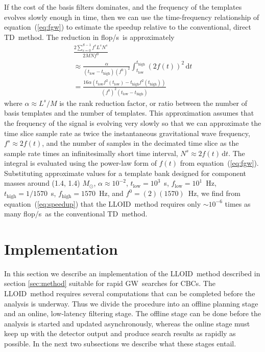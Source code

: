 \documentclass[preprint2]{aastex}
\newcommand{\GW}{GW}%
\newcommand{\CBC}{CBC}%
\newcommand{\tmpsamps}{\ensuremath{N}}
\newcommand{\numtmps}{\ensuremath{M}}
\newcommand{\svdtmps}[1]{\ensuremath{L^#1}}
\newcommand{\numsvdtmps}{\svdtmps{s}}
\newcommand{\slicesamps}[1]{\ensuremath{N^#1}}
\newcommand{\slicessamps}{\slicesamps{s}}
\newcommand{\flops}{flop/s}
\newcommand{\lloid}{LLOID}%
\newcommand{\TD}{TD}%
\begin{document}
If the cost of the basis filters dominates, and the frequency of the templates
evolves slowly enough in time, then we can use the time-frequency relationship
of equation~(\ref{eq:fgw}) to estimate the speedup relative to the conventional, direct
\TD\ method.  The reduction in \flops\ is approximately
%
\begin{multline}
\label{eq:speedup}
\frac{2 \sum_{s=0}^{S-1} f^s \numsvdtmps \slicessamps}{2 \numtmps \tmpsamps f^0} \\
\approx \frac{\alpha}{\left(t_\mathrm{low} - t_\mathrm{high}\right) \left(f^0\right)^2} \int_{t_\mathrm{low}}^{t_\mathrm{high}} \left(2 f(t) \right)^2 \, \mathrm{d} t \\
= \frac{16 \alpha \left(t_\mathrm{low} f^2 (t_\mathrm{low}) - t_\mathrm{high} f^2 (t_\mathrm{high}) \right)}{\left(f^0\right)^2 \left(t_\mathrm{low} - t_\mathrm{high}\right)}
\end{multline}
%
where $\alpha \approx \numsvdtmps / \numtmps$ is the rank reduction factor, or
ratio between the number of basis templates and the number of templates.  This
approximation assumes that the frequency of the signal is evolving very slowly
so that we can approximate the time slice sample rate as twice the instantaneous
gravitational wave frequency, $f^s \approx 2 f(t)$, and the number of samples in
the decimated time slice as the sample rate times an infinitesimally short time
interval, $\slicessamps \approx 2 f(t) \, \mathrm{d}t$. The integral is
evaluated using the power-law form of $f(t)$ from equation~(\ref{eq:fgw}).
Substituting approximate values for a template bank designed for component
masses around (1.4, 1.4) $M_\odot$, $\alpha \approx 10^{-2}$, $t_\mathrm{low} = 10^3$~s,
$f_\mathrm{low} = 10^1$~Hz, $t_\mathrm{high} = 1/1570$~s, $f_\mathrm{high} = 1570$~Hz,
and $f^0 = (2)(1570)$~Hz, we find from equation~(\ref{eq:speedup}) that the
\lloid\ method requires only $\sim 10^{-6}$ times as many \flops\ as the
conventional \TD\ method.

\section{Implementation}

In this section we describe an implementation of the \lloid\ method described
in section \ref{sec:method} suitable for rapid \GW\
searches for \CBC{}s.  The \lloid\ method requires several
computations that can be completed before the analysis is underway.  Thus
we divide the procedure into an offline planning stage and an
online, low-latency filtering stage.  The offline stage can be done before the
analysis is started and updated asynchronously, whereas the online stage must
keep up with the detector output and produce search results as rapidly as
possible.  In the next two subsections we describe what these stages entail.
\end{document}
